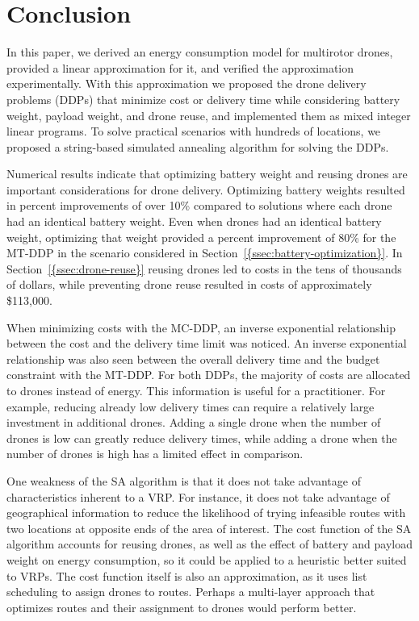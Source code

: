 \documentclass[journal]{IEEEtran}
\begin{document}
\section{Conclusion}
\label{sec:conclusion}

In this paper, we derived an energy consumption model for multirotor drones, provided a linear approximation for it, and verified the approximation experimentally. With this approximation we proposed the drone delivery problems (DDPs) that minimize cost or delivery time while considering battery weight, payload weight, and drone reuse, and implemented them as mixed integer linear programs. To solve practical scenarios with hundreds of locations, we proposed a string-based simulated annealing algorithm for solving the DDPs.

Numerical results indicate that optimizing battery weight and reusing drones are important considerations for drone delivery. Optimizing battery weights resulted in percent improvements of over 10\% compared to solutions where each drone had an identical battery weight. Even when drones had an identical battery weight, optimizing that weight provided a percent improvement of 80\% for the MT-DDP in the scenario considered in {Section~\ref{{ssec:battery-optimization}}}. In {Section~\ref{{ssec:drone-reuse}}} reusing drones led to costs in the tens of thousands of dollars, while preventing drone reuse resulted in costs of approximately \$113,000.

When minimizing costs with the MC-DDP, an inverse exponential relationship between the cost and the delivery time limit was noticed. An inverse exponential relationship was also seen between the overall delivery time and the budget constraint with the MT-DDP. For both DDPs, the majority of costs are allocated to drones instead of energy. This information is useful for a practitioner. For example, reducing already low delivery times can require a relatively large investment in additional drones. Adding a single drone when the number of drones is low can greatly reduce delivery times, while adding a drone when the number of drones is high has a limited effect in comparison.

One weakness of the SA algorithm is that it does not take advantage of characteristics inherent to a VRP. For instance, it does not take advantage of geographical information to reduce the likelihood of trying infeasible routes with two locations at opposite ends of the area of interest. The cost function of the SA algorithm accounts for reusing drones, as well as the effect of battery and payload weight on energy consumption, so it could be applied to a heuristic better suited to VRPs. The cost function itself is also an approximation, as it uses list scheduling to assign drones to routes. Perhaps a multi-layer approach that optimizes routes and their assignment to drones would perform better.
\end{document}
